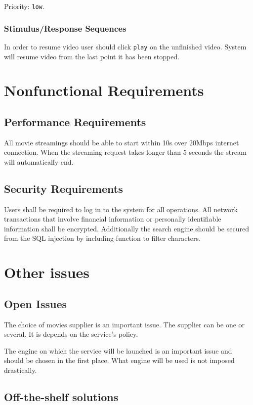 \documentclass{scrreprt}
\begin{document}
Priority: \verb|low|.

\subsection{Stimulus/Response Sequences}

In order to resume video user should click \verb|play| on the unfinished video. System will resume video from the last point it has been stopped. 

\chapter{Nonfunctional Requirements}

\section{Performance Requirements}

All movie streamings should be able to start within 10s over 20Mbps internet connection. When the streaming request takes longer than 5 seconds the stream will automatically end.

\section{Security Requirements}

Users shall be required to log in to the system for all operations. All network transactions that involve financial information or personally identifiable information shall be encrypted.
Additionally the search engine should be secured from the SQL injection by including function to filter characters.

\chapter{Other issues}

\section{Open Issues}
The choice of movies supplier is an important issue. The supplier can be one or several. It is depends on the service's policy.

The engine on which the service will be launched is an important issue and should be chosen in the first place. What engine will be used is not imposed drastically.

\section{Off-the-shelf solutions}
\end{document}

